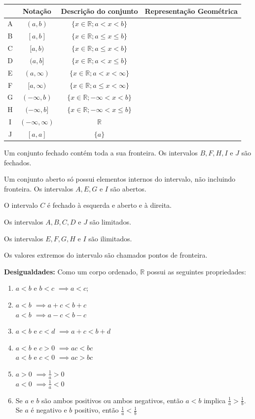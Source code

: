 \documentclass[oneside,a4paper,12pt]{article}
\begin{document}
\begin{table}[h!]
	\centering
	\begin{tabular}{|c|c|c|c|}
		\hline
		&	Notação			& Descrição do conjunto						 & Representação Geométrica \\
		\hline
		A	& $(a,b)$		& $\{ x \in \mathbb{R} ; a< x <b \} $		 & 	\\
		\hline
		B	& $[a,b]$		& $\{ x \in \mathbb{R} ; a\leq x \leq b \} $ & \\
		\hline
		C	& $[a,b)$		& $\{ x \in \mathbb{R} ; a\leq  x <b \} $	 & \\	
		\hline
		D	& $(a,b]$		& $\{ x \in \mathbb{R} ; a< x \leq b \} $	 & \\
		\hline
		E	& $(a, \infty)$	& $\{ x \in \mathbb{R} ; a< x < \infty \} $  & \\
		\hline
		F	& $[a,\infty)$	& $\{ x \in \mathbb{R} ; a \leq x <\infty \}$& \\
		\hline
		G	& $(- \infty,b)$& $\{ x \in \mathbb{R} ; - \infty < x <b \} $& \\
		\hline
		H	& $(- \infty, b]$& $\{ x \in \mathbb{R} ; -\infty< x \leq b \} $	 & \\
		\hline
		I	& $(- \infty, \infty)$ & $\mathbb{R}$ &	\\
		\hline
		J	& $[a,a]$		& $\{a\}$									 & \\
		\hline
	\end{tabular}
\end{table}

Um conjunto fechado contém toda a sua fronteira. Os intervalos $B,F,H,I$ e $J$ são fechados.

Um conjunto aberto só possui elementos internos do intervalo, não incluindo fronteira. Os intervalos $A,E,G$ e $I$ são abertos.

O intervalo $C$ é fechado à esquerda e aberto e à direita.

Os intervalos $A,B,C,D$ e $J$ são limitados.

Os intervalos $E,F,G,H$ e $I$ são ilimitados.

Os valores extremos do intervalo são chamados pontos de fronteira.

\textbf{Desigualdades:} Como um corpo ordenado, $\mathbb{R}$ possui as seguintes propriedades:
\begin{enumerate}
	\item $a<b$ e $b<c$ $\implies a<c$;
	\item $a<b$ $\implies a+c<b+c$ \\ $a<b$ $\implies a-c<b-c$
	\item $a<b$ e $c<d$ $\implies a+c<b+d$
	\item $a<b$ e $c>0$ $\implies ac<bc$ \\ $a<b$ e $c<0$ $\implies ac>bc$
	\item $a>0$ $\implies \frac{1}{a}>0$ \\ $a<0$ $\implies \frac{1}{a}<0$
	\item Se $a$ e $b$ são ambos positivos ou ambos negativos, então $a<b$ implica $\frac{1}{a} > \frac{1}{b}$. Se $a$ é negativo e $b$ positivo, então $\frac{1}{a} < \frac{1}{b}$
\end{enumerate}
\end{document}
